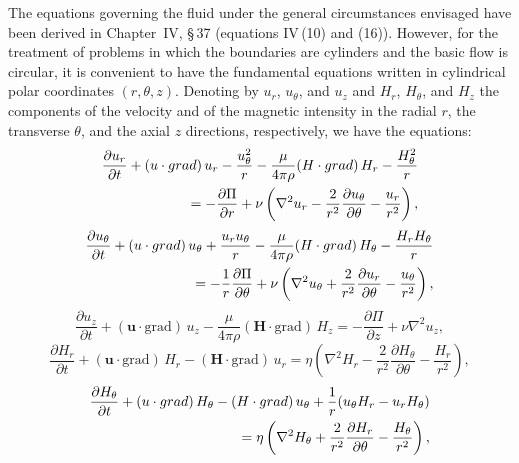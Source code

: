 The equations governing the fluid under the general circumstances envisaged have been derived in Chapter~IV, \S\,37 (equations IV\,(10) and (16)). However, for the treatment of problems in which the boundaries are cylinders and the basic flow is circular, it is convenient to have the fundamental equations written in cylindrical polar coordinates $(r, \theta, z)$. Denoting by $u_r$, $u_\theta$, and $u_z$ and $H_r$, $H_\theta$, and $H_z$ the components of the velocity and of the magnetic intensity in the radial $r$, the transverse $\theta$, and the axial $z$ directions, respectively, we have the equations:
\begin{align}
\frac{\partial u_r}{\partial t} + (\mathbf{u} \cdot \mathrm{grad})\, u_r - \frac{u_\theta^2}{r} - \frac{\mu}{4\pi\rho}(\mathbf{H} \cdot \mathrm{grad})\, H_r - \frac{H_\theta^2}{r} \notag \\
= -\frac{\partial \Pi}{\partial r} + \nu \left(\nabla^2 u_r - \frac{2}{r^2}\frac{\partial u_\theta}{\partial \theta} - \frac{u_r}{r^2}\right), \label{eq:9-1}
\end{align}
\begin{align}
\frac{\partial u_\theta}{\partial t} + (\mathbf{u} \cdot \mathrm{grad})\, u_\theta + \frac{u_r u_\theta}{r} - \frac{\mu}{4\pi\rho}(\mathbf{H} \cdot \mathrm{grad})\, H_\theta - \frac{H_r H_\theta}{r} \notag \\
= -\frac{1}{r}\frac{\partial \Pi}{\partial \theta} + \nu \left(\nabla^2 u_\theta + \frac{2}{r^2}\frac{\partial u_r}{\partial \theta} - \frac{u_\theta}{r^2}\right), \label{eq:9-2}
\end{align}
\begin{equation}
\frac{\partial u_z}{\partial t} + (\mathbf{u} \cdot \mathrm{grad})\, u_z - \frac{\mu}{4\pi\rho}(\mathbf{H} \cdot \mathrm{grad})\, H_z = -\frac{\partial \Pi}{\partial z} + \nu \nabla^2 u_z, \label{eq:9-3}
\end{equation}
\begin{equation}
\frac{\partial H_r}{\partial t} + (\mathbf{u} \cdot \mathrm{grad})\, H_r - (\mathbf{H} \cdot \mathrm{grad})\, u_r = \eta \left(\nabla^2 H_r - \frac{2}{r^2}\frac{\partial H_\theta}{\partial \theta} - \frac{H_r}{r^2}\right), \label{eq:9-4}
\end{equation}
\begin{align}
\frac{\partial H_\theta}{\partial t} + (\mathbf{u} \cdot \mathrm{grad})\, H_\theta - (\mathbf{H} \cdot \mathrm{grad})\, u_\theta + \frac{1}{r}(u_\theta H_r - u_r H_\theta) \notag \\
= \eta \left(\nabla^2 H_\theta + \frac{2}{r^2}\frac{\partial H_r}{\partial \theta} - \frac{H_\theta}{r^2}\right), \label{eq:9-5}
\end{align}
